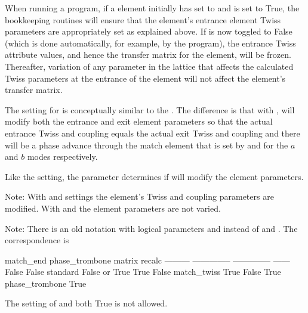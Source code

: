 {\begin{description}
When running a program, if a  element initially has  set to  and
 is set to True, the \bmad bookkeeping routines will ensure that the  element's
entrance element Twiss parameters are appropriately set as explained above. If  is now
toggled to False (which is done automatically, for example, by the \tao program), the entrance Twiss attribute
values, and hence the transfer matrix for the  element, will be frozen. Thereafter,
variation of any parameter in the lattice that affects the calculated Twiss parameters at the
entrance of the  element will not affect the  element's transfer matrix.
%
\item[phase_trombone] \Newline
The  setting for  is conceptually similar to the . The
difference is that with , \bmad will modify both the entrance and exit element
parameters so that the actual entrance Twiss and coupling equals the actual exit Twiss and coupling
and there will be a phase advance through the match element that is set by  and
 for the $a$ and $b$ modes respectively.

Like the  setting, the  parameter determines if \bmad will modify the element
parameters.
\end{description}

Note: With  and  settings the element's Twiss and coupling parameters
are modified. With  and  the element parameters are not varied.

Note: There is an old notation with logical parameters  and 
instead of  and .  The correspondence is
\begin{example}
  match_end   phase_trombone    matrix           recalc
  ---------   --------------    --------------   ------
  False       False             standard         False or True
  True        False             match_twiss      True
  False       True              phase_trombone   True
\end{example}
The setting of  and  both True is not allowed.

}
